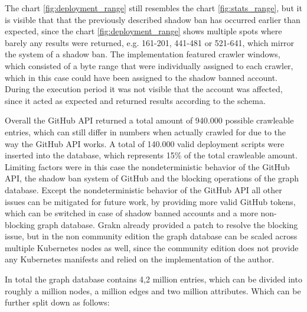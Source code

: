 The chart \ref{fig:deployment_range} still resembles the chart \ref{fig:stats_range}, but it is visible that that the previously described shadow ban has occurred earlier than expected, since the chart \ref{fig:deployment_range} shows multiple spots where barely any results were returned, e.g. 161-201, 441-481 or 521-641, which mirror the system of a shadow ban. The implementation featured crawler windows, which consisted of a byte range that were individually assigned to each crawler, which in this case could have been assigned to the shadow banned account. During the execution period it was not visible that the account was affected, since it acted as expected and returned results according to the schema.

Overall the GitHub API returned a total amount of 940.000 possible crawleable entries, which can still differ in numbers when actually crawled for due to the way the GitHub API works. A total of 140.000 valid deployment scripts were inserted into the database, which represents 15\% of the total crawleable amount. Limiting factors were in this case the nondeterministic behavior of the GitHub API, the shadow ban system of GitHub and the blocking operations of the graph database. Except the nondeterministic behavior of the GitHub API all other issues can be mitigated for future work, by providing more valid GitHub tokens, which can be switched in case of shadow banned accounts and a more non-blocking graph database. Grakn already provided a patch to resolve the blocking issue, but in the non community edition the graph database can be scaled across multiple Kubernetes nodes as well, since the community edition does not provide any Kubernetes manifests and relied on the implementation of the author.

In total the graph database contains 4,2 million entries, which can be divided into roughly a million nodes, a million edges and two million attributes. Which can be further split down as follows:

